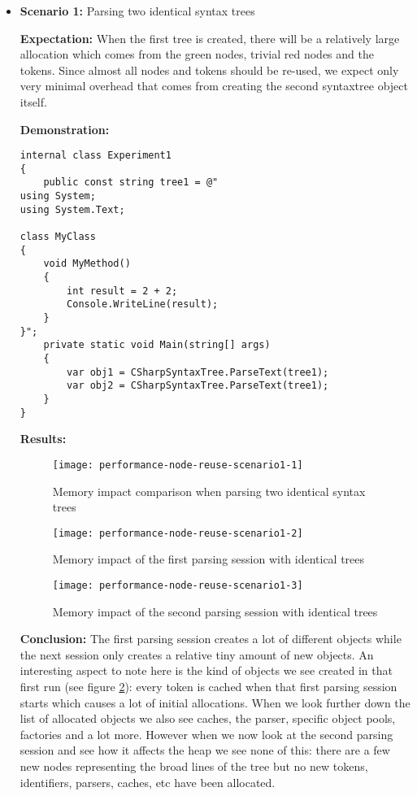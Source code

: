 \begin{itemize}
\item \textbf{Scenario 1:} Parsing two identical syntax trees

\textbf{Expectation:} When the first tree is created, there will be a relatively large allocation which comes from the green nodes, trivial red nodes and the tokens. Since almost all nodes and tokens should be re-used, we expect only very minimal overhead that comes from creating the second \gls{syntaxtree} object itself.

\textbf{Demonstration:} 

\begin{lstlisting}
internal class Experiment1
{
	public const string tree1 = @"
using System;
using System.Text;

class MyClass 
{
    void MyMethod()
    {
        int result = 2 + 2;
        Console.WriteLine(result);
    }
}";
	private static void Main(string[] args)
	{
		var obj1 = CSharpSyntaxTree.ParseText(tree1);
		var obj2 = CSharpSyntaxTree.ParseText(tree1);
	}
}
\end{lstlisting}

\textbf{Results:}

\begin{figure}[H]
\centering
\texttt{[image: performance-node-reuse-scenario1-1]}
\caption{Memory impact comparison when parsing two identical syntax trees}
\label{img:performance-node-reuse-scenario1-1}
\end{figure}

\begin{figure}[H]
\centering
\texttt{[image: performance-node-reuse-scenario1-2]}
\caption{Memory impact of the first parsing session with identical trees}
\label{img:performance-node-reuse-scenario1-2}
\end{figure}

\begin{figure}[H]
\centering
\texttt{[image: performance-node-reuse-scenario1-3]}
\caption{Memory impact of the second parsing session with identical trees}
\label{img:performance-node-reuse-scenario1-3}
\end{figure}

\begin{minipage}{\linewidth}
\textbf{Conclusion:} The first parsing session creates a lot of different objects while the next session only creates a relative tiny amount of new objects. An interesting aspect to note here is the kind of objects we see created in that first run (see figure \ref{img:performance-node-reuse-scenario1-2}): every token is cached when that first parsing session starts which causes a lot of initial allocations. 
When we look further down the list of allocated objects we also see caches, the parser, specific object pools, factories and a lot more. However when we now look at the second parsing session and see how it affects the heap we see none of this: there are a few new nodes representing the broad lines of the tree but no new tokens, identifiers, parsers, caches, etc have been allocated.
\end{minipage}



\end{itemize}
